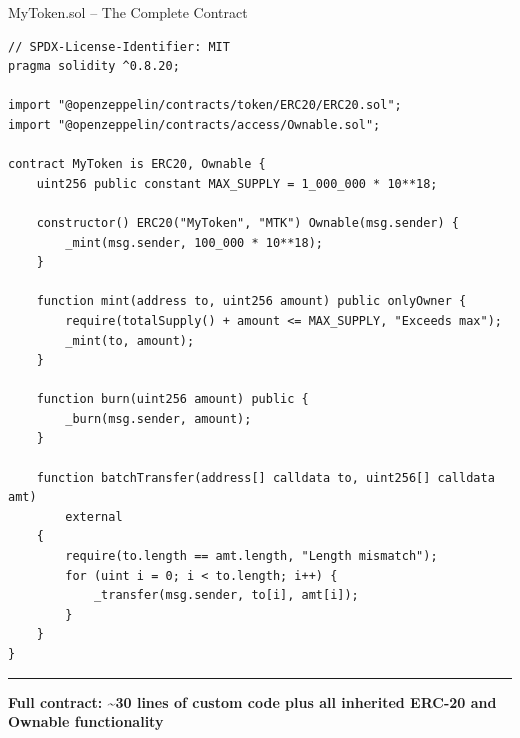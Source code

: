 \documentclass[8pt,aspectratio=169]{beamer}
\newcommand{\bottomnote}[1]{\vfill\vspace{-2mm}\textcolor{mllavender2}{\rule{\textwidth}{0.4pt}}\vspace{1mm}\footnotesize\textbf{#1}}
\begin{document}
\begin{frame}[fragile]{MyToken.sol -- The Complete Contract}
\begin{lstlisting}[language=Solidity]
// SPDX-License-Identifier: MIT
pragma solidity ^0.8.20;

import "@openzeppelin/contracts/token/ERC20/ERC20.sol";
import "@openzeppelin/contracts/access/Ownable.sol";

contract MyToken is ERC20, Ownable {
    uint256 public constant MAX_SUPPLY = 1_000_000 * 10**18;

    constructor() ERC20("MyToken", "MTK") Ownable(msg.sender) {
        _mint(msg.sender, 100_000 * 10**18);
    }

    function mint(address to, uint256 amount) public onlyOwner {
        require(totalSupply() + amount <= MAX_SUPPLY, "Exceeds max");
        _mint(to, amount);
    }

    function burn(uint256 amount) public {
        _burn(msg.sender, amount);
    }

    function batchTransfer(address[] calldata to, uint256[] calldata amt)
        external
    {
        require(to.length == amt.length, "Length mismatch");
        for (uint i = 0; i < to.length; i++) {
            _transfer(msg.sender, to[i], amt[i]);
        }
    }
}
\end{lstlisting}
  \bottomnote{Full contract: \textasciitilde30 lines of custom code plus all inherited ERC-20 and Ownable functionality}
\end{frame}
\end{document}
